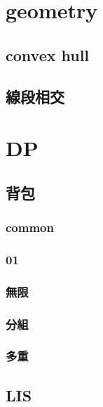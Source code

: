 \section{geometry}
\subsection{convex hull}


\subsection{線段相交}


\section{DP}

\subsection{背包}

\subsubsection{common}


\subsubsection{01}


\subsubsection{無限}


\subsubsection{分組}


\subsubsection{多重}


\subsection{LIS}


